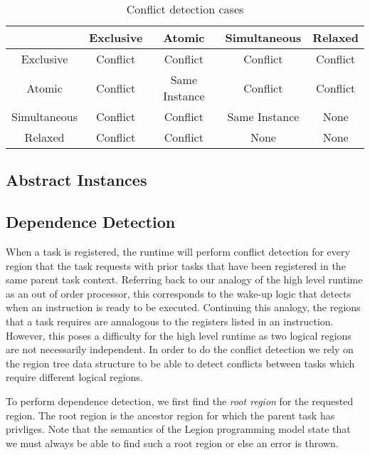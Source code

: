 \begin{center}
\begin{table}
\begin{tabular}{|c|c|c|c|c|} \hline
             & Exclusive & Atomic   & Simultaneous & Relaxed \\ \hline 
Exclusive    & Conflict  & Conflict & Conflict     & Conflict \\ \hline
Atomic       & Conflict  & Same Instance & Conflict & Conflict \\ \hline
Simultaneous & Conflict  & Conflict & Same Instance & None \\ \hline
Relaxed      & Conflict  & Conflict & None & None \\ \hline
\end{tabular}
\caption{Conflict detection cases}
\end{table}
\end{center}


\subsection{Abstract Instances}
\label{subsec:absinsts}

\subsection{Dependence Detection}
\label{subsec:depdetect}
When a task is registered, the runtime
will perform conflict detection for every region that the task requests with
prior tasks that have been registered in the same parent task context.  Referring
back to our analogy of the high level runtime as an out of order processor, this
corresponds to the wake-up logic that detects when an instruction is ready to be
executed.  Continuing this analogy, the regions that a task requires are annalogous
to the registers listed in an instruction.  However, this poses a difficulty for the
high level runtime as two logical regions are not necessarily independent.  In
order to do the conflict detection we rely on the region tree data structure to be
able to detect conflicts between tasks which require different logical regions.

To perform dependence detection, we first find the {\em root region} for the 
requested region.  The root region is the ancestor region for which the parent task
has privliges.  Note that the semantics of the Legion programming model state that
we must always be able to find such a root region or else an error is thrown.  

